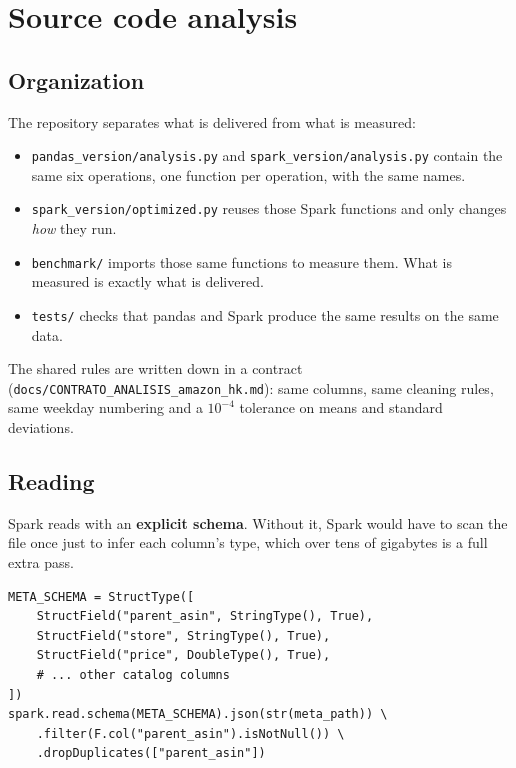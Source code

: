 \documentclass[11pt,a4paper]{article}
\begin{document}
\section{Source code analysis}

\subsection{Organization}

The repository separates what is delivered from what is measured:

\begin{itemize}
  \item \texttt{pandas\_version/analysis.py} and \texttt{spark\_version/analysis.py} contain
  the same six operations, one function per operation, with the same names.
  \item \texttt{spark\_version/optimized.py} reuses those Spark functions and only changes
  \emph{how} they run.
  \item \texttt{benchmark/} imports those same functions to measure them. What is measured is
  exactly what is delivered.
  \item \texttt{tests/} checks that pandas and Spark produce the same results on the same
  data.
\end{itemize}

The shared rules are written down in a contract
(\texttt{docs/CONTRATO\_ANALISIS\_amazon\_hk.md}): same columns, same cleaning rules, same
weekday numbering and a $10^{-4}$ tolerance on means and standard deviations.

\subsection{Reading}

Spark reads with an \textbf{explicit schema}. Without it, Spark would have to scan the file
once just to infer each column's type, which over tens of gigabytes is a full extra pass.

\begin{lstlisting}[caption={Explicit catalog schema in Spark.}]
META_SCHEMA = StructType([
    StructField("parent_asin", StringType(), True),
    StructField("store", StringType(), True),
    StructField("price", DoubleType(), True),
    # ... other catalog columns
])
spark.read.schema(META_SCHEMA).json(str(meta_path)) \
    .filter(F.col("parent_asin").isNotNull()) \
    .dropDuplicates(["parent_asin"])
\end{lstlisting}
\end{document}
